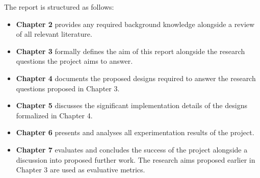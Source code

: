 The report is structured as follows:

\begin{itemize}
    \item \textbf{Chapter 2} provides any required background knowledge alongside a review of all relevant literature.

    \item \textbf{Chapter 3} formally defines the aim of this report alongside the research questions the project aims to answer.

    \item \textbf{Chapter 4} documents the proposed designs required to answer the research questions proposed in Chapter 3.

    \item \textbf{Chapter 5} discusses the significant implementation details of the designs formalized in Chapter 4.

    \item \textbf{Chapter 6} presents and analyses all experimentation results of the project.

    \item \textbf{Chapter 7} evaluates and concludes the success of the project alongside a discussion into proposed further work. The research aims proposed earlier in Chapter 3 are used as evaluative metrics.
\end{itemize}